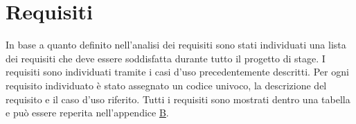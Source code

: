 \section{Requisiti}
In base a quanto definito nell'analisi dei requisiti sono stati individuati una lista dei requisiti che deve essere soddisfatta durante tutto il progetto di stage. I requisiti sono individuati tramite i casi d'uso precedentemente descritti. Per ogni requisito individuato è stato assegnato un codice univoco, la descrizione del requisito e il caso d'uso riferito. Tutti i requisiti sono mostrati dentro una tabella e può essere reperita nell'appendice {\hyperref[cap:appendice b]{B}}.